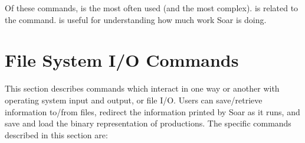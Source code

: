 Of these commands,  is the most often used (and the most complex).  is related to the  command.  is useful for understanding how much work Soar is doing.

\divider 


\divider 


\divider 


\divider 


\divider 


\divider 


\divider 



\section{File System I/O Commands}
\label{INTERFACE-file-io}

This section describes commands which interact in one way or another with operating system input and output, or file I/O.  Users can save/retrieve information to/from files, redirect the information printed by Soar as it runs, and save and load the binary representation of productions. The specific commands described in this section are:

